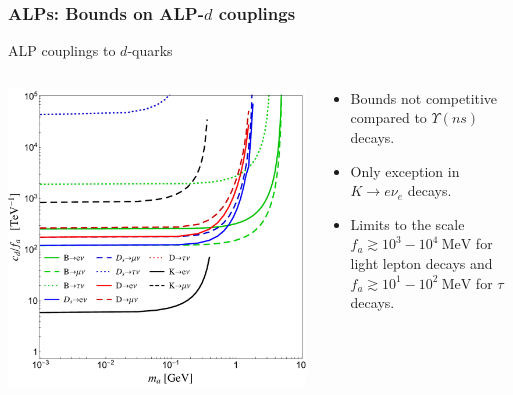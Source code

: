 \documentclass[mathserif, 10pt]{beamer}
\begin{document}
\begin{frame}\frametitle{ALPs: Bounds on ALP-$d$ couplings}
    ALP couplings to $d$-quarks
    \begin{columns}
        \begin{column}{0.5\textwidth}
            \includegraphics[width=\columnwidth]{figures/Fig2bS}
        \end{column}
        \begin{column}{0.5\textwidth}
            \begin{itemize}
                \item Bounds not competitive compared to $\Upsilon(ns)$ decays.
                \item Only exception in $K\to e \nu_e$ decays.
                \item Limits to the scale $f_a \gtrsim 10^3- 10^4~\mathrm{MeV}$ for light lepton decays and $f_a \gtrsim 10^1 - 10^2~\mathrm{MeV}$ for $\tau$ decays.
            \end{itemize}
        \end{column}
    \end{columns}
\end{frame}
\end{document}
